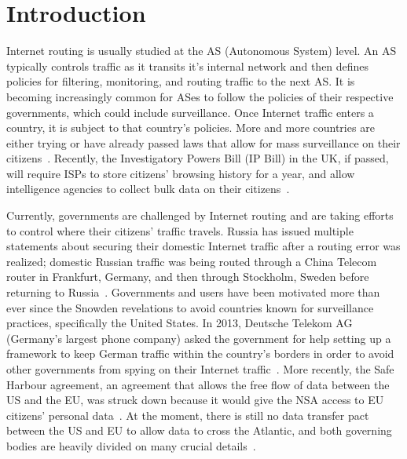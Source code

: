 \section{Introduction}
\label{intro}

Internet routing is usually studied at the AS (Autonomous System) level.  An AS typically controls traffic as it transits it's internal network and then defines policies for filtering, monitoring, and routing traffic to the next AS.  It is becoming increasingly common for ASes to follow the policies of their respective governments, which could include surveillance.  Once Internet traffic enters a country, it is subject to that country's policies.  More and more countries are either trying or have already passed laws that allow for mass surveillance on their citizens~\cite{france_surveillance, netherlands_surveillance, kazak_surveillance}.  Recently, the Investigatory Powers Bill (IP Bill) in the UK, if passed, will require ISPs to store citizens' browsing history for a year, and allow intelligence agencies to collect bulk data on their citizens~\cite{uk_bill}.

Currently, governments are challenged by Internet routing and are taking efforts to control where their citizens' traffic travels.  Russia has issued multiple statements about securing their domestic Internet traffic after a routing error was realized; domestic Russian traffic was being routed through a China Telecom router in Frankfurt, Germany, and then through Stockholm, Sweden before returning to Russia~\cite{russia_secure_internet, routing_errors}.  Governments and users have been motivated more than ever since the Snowden revelations to avoid countries known for surveillance practices, specifically the United States.  In 2013, Deutsche Telekom AG (Germany's largest phone company) asked the government for help setting up a framework to keep German traffic within the country's borders in order to avoid other governments from spying on their Internet traffic~\cite{dte}.  More recently, the Safe Harbour agreement, an agreement that allows the free flow of data between the US and the EU, was struck down because it would give the NSA access to EU citizens' personal data~\cite{safe_harbour_illegal}.  At the moment, there is still no data transfer pact between the US and EU to allow data to cross the Atlantic, and both governing bodies are heavily divided on many crucial details~\cite{safe_harbour_undecided}.

